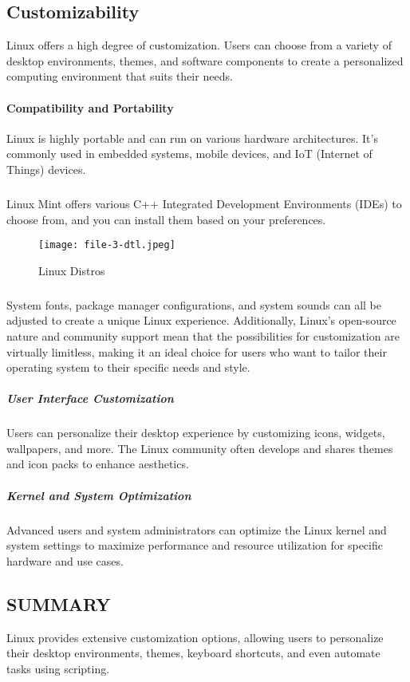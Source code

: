 \documentclass{article}
\begin{document}
\subsection{Customizability}
Linux offers a high degree of customization. Users can choose from a variety of desktop environments, themes, and software components to create a personalized computing environment that suits their needs.

\paragraph{Compatibility and Portability}
Linux is highly portable and can run on various hardware architectures. It's commonly used in embedded systems, mobile devices, and IoT (Internet of Things) devices.

\subparagraph{}
Linux Mint offers various C++ Integrated Development Environments (IDEs) to choose from, and you can install them based on your preferences. 



\begin{figure}
\texttt{[image: file-3-dtl.jpeg]}
\caption{Linux Distros}
\label{fig:Linux Distros}
\end{figure}



\subparagraph{}
System fonts, package manager configurations, and system sounds can all be adjusted to create a unique Linux experience. Additionally, Linux's open-source nature and community support mean that the possibilities for customization are virtually limitless, making it an ideal choice for users who want to tailor their operating system to their specific needs and style.


\subparagraph{User Interface Customization}
Users can personalize their desktop experience by customizing icons, widgets, wallpapers, and more. The Linux community often develops and shares themes and icon packs to enhance aesthetics.

\subparagraph{Kernel and System Optimization}
\cite{4}
Advanced users and system administrators can optimize the Linux kernel and system settings to maximize performance and resource utilization for specific hardware and use cases.


\subsection{SUMMARY}
Linux provides extensive customization options, allowing users to personalize their desktop environments, themes, keyboard shortcuts, and even automate tasks using scripting.
\end{document}
